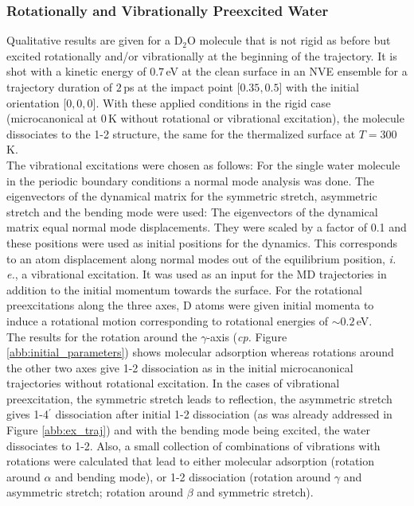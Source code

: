 \documentclass[11pt,DIV=13,BCOR=5mm,a4paper,headinclude]{scrbook}
\begin{document}
\subsubsection{Rotationally and Vibrationally Preexcited Water}\label{preex}
Qualitative results are given for a D$_2$O molecule that is not rigid as before but excited rotationally and/or vibrationally at the beginning of the trajectory.
It is shot with a kinetic energy of $0.7\,$eV at the clean surface in an NVE ensemble for a trajectory duration of $2\,$ps at the impact point [$0.35,0.5$] with the initial orientation [$0,0,0$].
With these applied conditions in the rigid case (microcanonical at $0\,$K without rotational or vibrational excitation), the molecule dissociates to the 1-2 structure, the same for the thermalized surface at $T=300\,$K.
\\
The vibrational excitations were chosen as follows: For the single water molecule in the periodic boundary conditions a normal mode analysis	 was done.
The eigenvectors of the dynamical matrix for the symmetric stretch, asymmetric stretch and the bending mode were used: The eigenvectors of the dynamical matrix equal normal mode displacements.
They were scaled by a factor of 0.1 and these positions were used as initial positions
for the dynamics.
This corresponds to an atom displacement along normal modes out of the equilibrium position, \textit{i.
e.}, a vibrational excitation.
It was used as an input for the MD trajectories in addition to the initial momentum towards the surface.
For the rotational preexcitations along the three axes, D atoms were given initial momenta to induce a rotational motion corresponding to rotational energies of $\sim 0.2\,$eV.
\\
The results for the rotation around the $\gamma$-axis (\textit{cp.} Figure \ref{abb:initial_parameters}) shows molecular adsorption whereas rotations around the other two axes give 1-2 dissociation as in the initial microcanonical trajectories without rotational excitation.
In the cases of vibrational preexcitation, the symmetric stretch leads to reflection, the asymmetric stretch gives 1-4$^\prime$ dissociation after initial 1-2 dissociation (as was already addressed in Figure \ref{abb:ex_traj}) and with the bending mode being excited, the water dissociates to 1-2.
Also, a small collection of combinations of vibrations with rotations were calculated that lead to either molecular adsorption (rotation around $\alpha$ and bending mode), or 1-2 dissociation (rotation around $\gamma$ and asymmetric stretch; rotation around $\beta$ and symmetric stretch).
\end{document}
